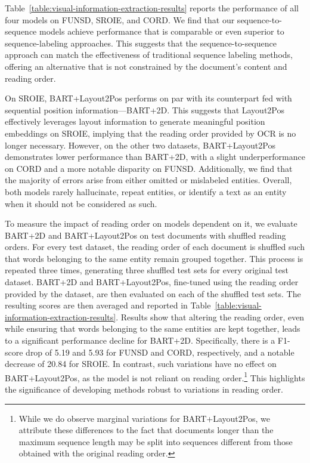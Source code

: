 Table~\ref{table:visual-information-extraction-results} reports the performance of all four models on FUNSD, SROIE, and CORD. We find that our sequence-to-sequence models achieve performance that is comparable or even superior to sequence-labeling approaches. This suggests that the sequence-to-sequence approach can match the effectiveness of traditional sequence labeling methods, offering an alternative that is not constrained by the document's content and reading order. 

On SROIE, BART+Layout2Pos performs on par with its counterpart fed with sequential position information—BART+2D. This suggests that Layout2Pos effectively leverages layout information to generate meaningful position embeddings on SROIE, implying that the reading order provided by \ac{OCR} is no longer necessary. However, on the other two datasets, BART+Layout2Pos demonstrates lower performance than BART+2D, with a slight underperformance on CORD and a more notable disparity on FUNSD. Additionally, we find that the majority of errors arise from either omitted or mislabeled entities. Overall, both models rarely hallucinate, repeat entities, or identify a text as an entity when it should not be considered as such. 

To measure the impact of reading order on models dependent on it, we evaluate BART+2D and BART+Layout2Pos on test documents with shuffled reading orders. For every test dataset, the reading order of each document is shuffled such that words belonging to the same entity remain grouped together. This process is repeated three times, generating three shuffled test sets for every original test dataset. BART+2D and BART+Layout2Pos, fine-tuned using the reading order provided by the dataset, are then evaluated on each of the shuffled test sets. The resulting scores are then averaged and reported in Table~\ref{table:visual-information-extraction-results}. Results show that altering the reading order, even while ensuring that words belonging to the same entities are kept together, leads to a significant performance decline for BART+2D. Specifically, there is a F1-score drop of 5.19 and 5.93 for FUNSD and CORD, respectively, and a notable decrease of 20.84 for SROIE. In contrast, such variations have no effect on BART+Layout2Pos, as the model is not reliant on reading order.\footnote{While we do observe marginal variations for BART+Layout2Pos, we attribute these differences to the fact that documents longer than the maximum sequence length may be split into sequences different from those obtained with the original reading order.} This highlights the significance of developing methods robust to variations in reading order.

